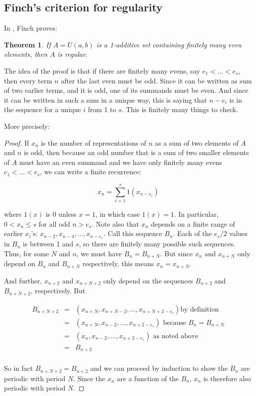 \documentclass{report}
\newtheorem{theorem}{Theorem}[section]
\theoremstyle{remark}
\numberwithin{equation}{section}
\begin{document}
\subsection{Finch's criterion for regularity}

In \cite{finch:em1992}, Finch proves:

\begin{theorem}
If $A = U(a,b)$ is a 1-additive set containing finitely many even
elements, then $A$ is regular.  
\end{theorem}

The idea of the proof is that if there are finitely many evens, say
$e_1 < \ldots < e_s$, then every term $n$ after the last even must be
odd.  Since it can be written as sum of two earlier terms, and it is
odd, one of its summands must be even.  And since it can be written in
such a sum in a unique way, this is saying that $n - e_i$ is in the
sequence for a unique $i$ from 1 to $s$.  This is finitely many things
to check.

More precisely:

\begin{proof}

  If $x_n$ is the number of representations of $n$ as a sum of two
  elements of $A$ and $n$ is odd, then because an odd number that is a
  sum of two smaller elements of $A$ must have an even summand and we
  have only finitely many evens $e_1 < \ldots < e_s$, we can write a
  finite recurrence:

  \[x_n = \sum_{i=1}^s 1(x_{n-e_i})\]
  
  where $1(x)$ is 0 unless $x = 1$, in which case $1(x) = 1$.  In
  particular, $0 < x_n \leq s$ for all odd $n > e_s$.  Note also that
  $x_n$ depends on a finite range of earlier $x_i$'s:
  $x_{n-2}, x_{n-4}, \ldots, x_{n-e_s}$.  Call this sequence $B_n$.
  Each of the $e_s/2$ values in $B_n$ is between 1 and $s$, so there
  are finitely many possible such sequences.  Thus, for some $N$ and
  $n$, we must have $B_n = B_{n+N}$.  But since $x_n$ and $x_{n+N}$
  only depend on $B_n$ and $B_{n+N}$ respectively, this means
  $x_n = x_{n+N}$.

  And further, $x_{n+2}$ and $x_{n+N+2}$ only depend on the sequences
  $B_{n+2}$ and $B_{n+N+2}$, respectively.  But 

  \begin{eqnarray*}
    B_{n+N+2} &=& (x_{n+N}, x_{n+N-2}, \ldots, x_{n+N+2-e_s}) \text{
    by definition}\\
    &=& (x_{n+N}, x_{n-2}, \ldots, x_{n+2-e_s}) \text{ because $B_n
                                                  = B_{n+N}$}\\
    &=& (x_{n}, x_{n-2}, \ldots, x_{n+2-e_s}) \text{ as noted
                                                above}\\
              &=& B_{n+2}\\
  \end{eqnarray*}

  So in fact $B_{n+N+2} = B_{n+2}$ and we can proceed by induction to
  show the $B_n$ are periodic with period $N$.  Since the $x_n$ are a
  function of the $B_n$, $x_n$ is therefore also periodic with period
  $N$.
\end{proof}
\end{document}

